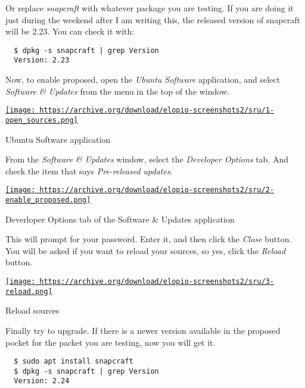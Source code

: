 \documentclass[12pt]{article}
\begin{document}
Or replace \emph{snapcraft} with whatever package you are testing. If you are
doing it just during the weekend after I am writing this, the released
version of snapcraft will be 2.23. You can check it with:

\begin{verbatim}
  $ dpkg -s snapcraft | grep Version
  Version: 2.23
\end{verbatim}

Now, to enable proposed, open the \emph{Ubuntu Software} application, and
select \emph{Software & Updates} from the menu in the top of the window.

\begin{center}
  \href{
    https://archive.org/download/elopio-screenshots2/sru/1-open_sources.png}{
    \texttt{[image: 
    https://archive.org/download/elopio-screenshots2/sru/1-open\_sources.png]}
  }
  \caption{Ubuntu Software application}
\end{center}

From the \emph{Software & Updates} window, select the \emph{Developer Options}
tab. And check the item that says \emph{Pre-released updates}.

\begin{center}
  \href{
    https://archive.org/download/elopio-screenshots2/sru/2-enable_proposed.png}{
    \texttt{[image: 
    https://archive.org/download/elopio-screenshots2/sru/2-enable\_proposed.png]}
  }
  \caption{Deverloper Options tab of the Software & Updates application}
\end{center}

This will prompt for your password. Enter it, and then click the
\emph{Close} button. You will be asked if you want to reload your sources, so
yes, click the \emph{Reload} button.

\begin{center}
  \href{
    https://archive.org/download/elopio-screenshots2/sru/3-reload.png}{
    \texttt{[image: 
    https://archive.org/download/elopio-screenshots2/sru/3-reload.png]}
  }
  \caption{Reload sources}
\end{center}

Finally try to upgrade. If there is a newer version available in the proposed
pocket for the packet you are testing, now you will get it.

\begin{verbatim}
  $ sudo apt install snapcraft
  $ dpkg -s snapcraft | grep Version
  Version: 2.24
\end{verbatim}
\end{document}
